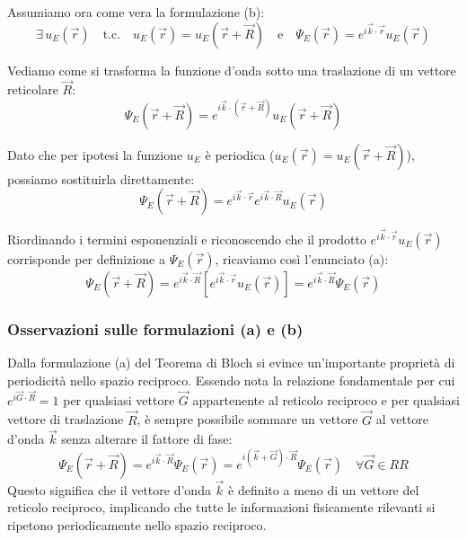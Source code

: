 Assumiamo ora come vera la formulazione (b):
\begin{equation}
    \exists \, u_E(\vec{r}) \quad \text{t.c.} \quad u_E(\vec{r}) = u_E(\vec{r} + \vec{R}) \quad \text{e} \quad \Psi_E(\vec{r}) = e^{i\vec{k}\cdot\vec{r}} u_E(\vec{r})
\end{equation}

Vediamo come si trasforma la funzione d'onda sotto una traslazione di un vettore reticolare \(\vec{R}\):
\begin{equation}
    \Psi_E(\vec{r} + \vec{R}) = e^{i\vec{k}\cdot(\vec{r} + \vec{R})} u_E(\vec{r} + \vec{R})
\end{equation}

Dato che per ipotesi la funzione \(u_E\) è periodica (\(u_E(\vec{r}) = u_E(\vec{r} + \vec{R})\)), possiamo sostituirla direttamente:
\begin{equation}
    \Psi_E(\vec{r} + \vec{R}) = e^{i\vec{k}\cdot\vec{r}} e^{i\vec{k}\cdot\vec{R}} u_E(\vec{r})
\end{equation}

Riordinando i termini esponenziali e riconoscendo che il prodotto \(e^{i\vec{k}\cdot\vec{r}} u_E(\vec{r})\) corrisponde per definizione a \(\Psi_E(\vec{r})\), ricaviamo così l'enunciato (a):
\begin{equation}
    \Psi_E(\vec{r} + \vec{R}) = e^{i\vec{k}\cdot\vec{R}} \left[ e^{i\vec{k}\cdot\vec{r}} u_E(\vec{r}) \right] = e^{i\vec{k}\cdot\vec{R}} \Psi_E(\vec{r})
\end{equation}

\subsubsection{Osservazioni sulle formulazioni (a) e (b)}

Dalla formulazione (a) del Teorema di Bloch si evince un'importante proprietà di periodicità nello spazio reciproco. Essendo nota la relazione fondamentale per cui \(e^{i\vec{G}\cdot\vec{R}} = 1\) per qualsiasi vettore \(\vec{G}\) appartenente al reticolo reciproco e per qualsiasi vettore di traslazione \(\vec{R}\), è sempre possibile sommare un vettore \(\vec{G}\) al vettore d'onda \(\vec{k}\) senza alterare il fattore di fase:
\begin{equation}
    \Psi_E(\vec{r} + \vec{R}) = e^{i\vec{k}\cdot\vec{R}} \Psi_E(\vec{r}) = e^{i(\vec{k} + \vec{G})\cdot\vec{R}} \Psi_E(\vec{r}) \quad \forall \vec{G} \in RR
\end{equation}
Questo significa che il vettore d'onda \(\vec{k}\) è definito a meno di un vettore del reticolo reciproco, implicando che tutte le informazioni fisicamente rilevanti si ripetono periodicamente nello spazio reciproco.

